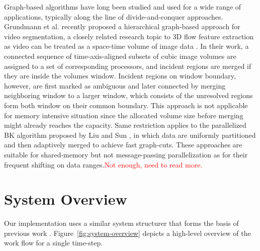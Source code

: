 \documentclass[10pt, conference, compsocconf]{IEEEtran}
\begin{document}
Graph-based algorithms have long been studied and used for a wide range of applications, typically along the line of divide-and-conquer approaches.
Grundmann et al. \cite{Grundmann2010} recently proposed a hierarchical graph-based approach for video segmentation, a closely related research topic to 3D flow feature extraction as video can be treated as a space-time volume of image data \cite{Klein2002}. In their work, a connected sequence of time-axis-aligned subsets of cubic image volumes are assigned to a set of corresponding processors, and incident regions are merged if they are inside the volumes window. Incident regions on window boundary, however, are first marked as ambiguous and later connected by merging neighboring window to a larger window, which consists of the unresolved regions form both window on their common boundary. This approach is not applicable for memory intensive situation since the allocated volume size before merging might already reaches the capacity. Same restriction applies to the parallelized BK algorithm \cite{Boykov2004} proposed by Liu and Sun \cite{Liu2010}, in which data are uniformly partitioned and then adaptively merged to achieve fast graph-cuts. These approaches are suitable for shared-memory but not message-passing parallelization as for their frequent shifting on data ranges.\textcolor{red}{Not enough, need to read more.}

\section{System Overview}
Our implementation uses a similar system structurer that forms the basis of previous work \cite{Muelder2009}. Figure~\ref{fig:system-overview} depicts a high-level overview of the work flow for a single time-step. 
\end{document}
